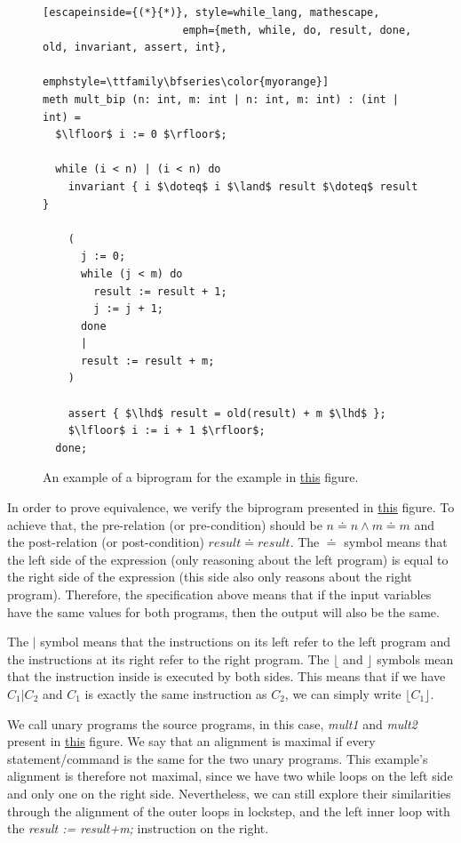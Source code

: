 \begin{figure}[h]
  \centering
  \noindent
  \begin{lstlisting}[escapeinside={(*}{*)}, style=while_lang, mathescape,
                      emph={meth, while, do, result, done, old, invariant, assert, int},
                      emphstyle=\ttfamily\bfseries\color{myorange}]
meth mult_bip (n: int, m: int | n: int, m: int) : (int | int) =
  $\lfloor$ i := 0 $\rfloor$;

  while (i < n) | (i < n) do
    invariant { i $\doteq$ i $\land$ result $\doteq$ result }

    (
      j := 0;
      while (j < m) do
        result := result + 1;
        j := j + 1;
      done
      |
      result := result + m;
    )

    assert { $\lhd$ result = old(result) + m $\lhd$ };
    $\lfloor$ i := i + 1 $\rfloor$;
  done;
  \end{lstlisting}
  \caption{An example of a biprogram for the example in \hyperref[fig:mult_source_programs]{this} figure.}
  \label{fig:mult_biprogram}
\end{figure}

In order to prove equivalence, we verify the biprogram presented in \hyperref[fig:mult_biprogram]{this} figure.
To achieve that, the pre-relation (or pre-condition) should be \(n \doteq n \land m \doteq m \) and the post-relation (or post-condition) \(result \doteq result\).
The $\doteq$ symbol means that the left side of the expression (only reasoning about the left program) is equal to the right side of the expression (this side also only reasons about the right program).
Therefore, the specification above means that if the input variables have the same values for both programs, then the output will also be the same.

The $|$ symbol means that the instructions on its left refer to the left program and the instructions at its right refer to the right program.
The $\lfloor$ and $\rfloor$ symbols mean that the instruction inside is executed by both sides.
This means that if we have $C_1 | C_2$ and $C_1$ is exactly the same instruction as $C_2$, we can simply write $\lfloor C_1 \rfloor$.

We call unary programs the source programs, in this case, \emph{mult1} and \emph{mult2} present in \hyperref[fig:mult_source_programs]{this} figure.
We say that an alignment is maximal if every statement/command is the same for the two unary programs.
This example's alignment is therefore not maximal, since we have two while loops on the left side and only one on the right side.
Nevertheless, we can still explore their similarities through the alignment of the outer loops in lockstep, and the left inner loop with the \emph{result := result+m;} instruction on the right.

